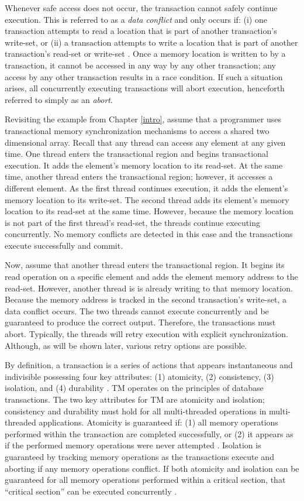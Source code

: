 \documentclass[11pt]{book}
\begin{document}
Whenever safe access does not occur, the transaction cannot safely continue
execution.  This is referred to as a \emph{data conflict} and only occurs if:
(i) one transaction attempts to read a location that is part of another
transaction's write-set, or (ii) a transaction attempts to write a location that
is part of another transaction's read-set or write-set \cite{intel_prog_ref}.
Once a memory location is written to by a transaction, it cannot be accessed in
any way by any other transaction; any access by any other transaction results in
a race condition.  If such a situation arises, all concurrently executing
transactions will abort execution, henceforth referred to simply as an
\emph{abort}.

Revisiting the example from Chapter \ref{intro}, assume that a programmer uses
transactional memory synchronization mechanisms to access a shared two dimensional array.
Recall that any thread can access any element at any given time.  One thread enters the
transactional region and begins transactional execution.  It adds the element's memory
location to its read-set.  At the same time, another thread enters the transactional
region; however, it accesses a different element.  As the first thread continues
execution, it adds the element's memory location to its write-set.  The second thread adds
its element's memory location to its read-set at the same time.  However, because the
memory location is not part of the first thread's read-set, the threads continue executing
concurrently.  No memory conflicts are detected in this case and the transactions execute
successfully and commit.

Now, assume that another thread enters the transactional region.  It begins its read
operation on a specific element and adds the element memory address to the read-set.
However, another thread is is already writing to that memory location.  Because the memory
address is tracked in the second transaction's write-set, a data conflict occurs.  The two
threads cannot execute concurrently and be guaranteed to produce the correct output.
Therefore, the transactions must abort.  Typically, the threads will retry execution with
explicit synchronization.  Although, as will be shown later, various retry options are
possible. 

By definition, a transaction is a series of actions that appears instantaneous and
indivisible possessing four key attributes: (1) atomicity, (2) consistency, (3) isolation,
and (4) durability \cite{tm_2nd}.  TM operates on the principles of database transactions.
The two key attributes for TM are atomicity and isolation; consistency and durability must
hold for all multi-threaded operations in multi-threaded applications.  Atomicity is
guaranteed if: (1) all memory operations performed within the transaction are completed
successfully, or (2) it appears as if the performed memory operations were never attempted
\cite{tm_2nd}.  Isolation is guaranteed by tracking memory operations as the transactions
execute and aborting if any memory operations conflict.  If both atomicity and isolation
can be guaranteed for all memory operations performed within a critical section, that
``critical section'' can be executed concurrently \cite{sle_rajwar}.
\end{document}
